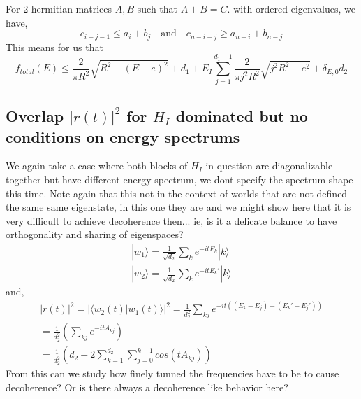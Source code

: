 \documentclass{article}
\begin{document}
For 2 hermitian matrices $A,B$ such that $A+B=C$. with ordered eigenvalues, we have,
\begin{equation}
    c_{i+j-1}\leq a_i+b_j\quad\text{and}\quad c_{n-i-j}\geq a_{n-i}+b_{n-j}
\end{equation}
This means for us that
\begin{equation}
    f_{total}(E)\leq \frac{2}{\pi R^2}\sqrt{R^2-(E-e)^2} + d_1 + E_I\sum^{d_1-1}_{j=1}\frac{2}{\pi j^2 R^2}\sqrt{j^2R^2-e^2} +\delta_{E,0}d_2
\end{equation}

\subsection{Overlap $|r(t)|^2$ for $H_I$ dominated but no conditions on energy spectrums}
We again take a case where both blocks of $H_I$ in question are diagonalizable together but have different energy spectrum, we dont specify the spectrum shape this time. Note again that this not in the context of worlds that are not defined the same same eigenstate, in this one they are and we might show here that it is very difficult to achieve decoherence then... ie, is it a delicate balance to have orthogonality and sharing of eigenspaces? 
\begin{align}
    |w_1\rangle = \frac{1}{\sqrt{d_2}}\sum_ke^{-itE_k}|k\rangle\\
    |w_2\rangle = \frac{1}{\sqrt{d_2}}\sum_ke^{-itE_k'}|k\rangle
\end{align}
and,
\begin{align}
    |r(t)|^2=|\langle w_2(t)|w_1(t)\rangle|^2 = \frac{1}{d_2^2}\sum_{kj}e^{-it((E_k-E_j)-(E_k'-E_j'))}\\
    =\frac{1}{d_2^2}(\sum_{kj}e^{-itA_{kj}})\\
    =\frac{1}{d_2^2}(d_2+2\sum^{d_2}_{k=1}\sum^{k-1}_{j=0}cos(tA_{kj}))
\end{align}
From this can we study how finely tunned the frequencies have to be to cause decoherence? Or is there always a decoherence like behavior here? 
\end{document}
